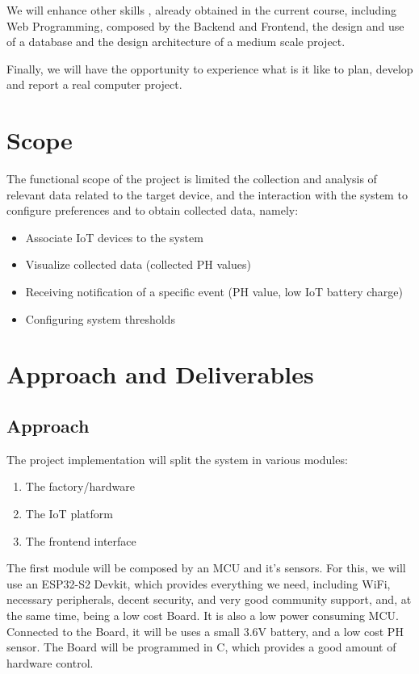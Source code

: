 \documentclass[a4paper,twoside,11pt]{article}
\begin{document}
We will enhance other skills , already obtained in the current course, including Web Programming, composed by the Backend and Frontend, the design and use of a database and the design architecture of a medium scale project. 

Finally, we will have the opportunity to experience what is it like to plan, develop and report a real computer project.

\section*{Scope}
The functional scope of the project is limited the collection and analysis of relevant data related to the target device, and the interaction with the system to configure preferences and to obtain collected data, namely:
\begin{itemize}
    \item Associate IoT devices to the system
    \item Visualize collected data (collected PH values)
    \item Receiving notification of a specific event (PH value, low IoT battery charge)
    \item Configuring system thresholds
\end{itemize}

\section*{Approach and Deliverables}
\subsection{Approach}
The project implementation will split the system in various modules:
\begin{enumerate}
    \item The factory/hardware
    \item The IoT platform
    \item The frontend interface
\end{enumerate}
The first module will be composed by an MCU and it's sensors. For this, we will use an ESP32-S2 Devkit, which provides everything we need, including WiFi, necessary peripherals, decent security, and very good community support, and, at the same time, being a low cost Board. It is also a low power consuming MCU.
Connected to the Board, it will be uses a small 3.6V battery, and a low cost PH sensor. The Board will be programmed in C, which provides a good amount of hardware control.
\end{document}
